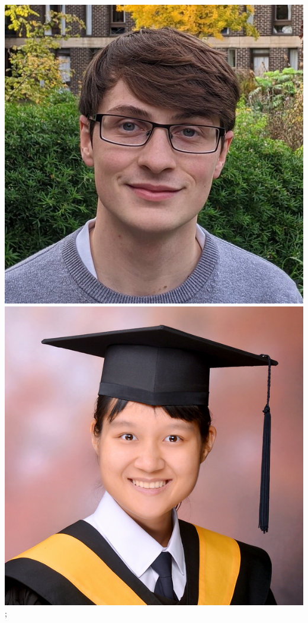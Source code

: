 \documentclass[aspectratio=169,handout]{beamer}
\begin{document}
\begin{frame}
{        \includegraphics[width=0.09\textheight]{figures/students/thomas_gessey-jones.jpg}%
        \includegraphics[width=0.09\textheight]{figures/students/wei-ning_deng.jpg}%
    };
\end{frame}
\end{document}
